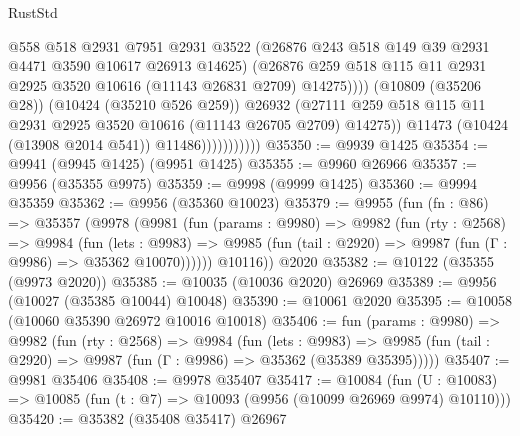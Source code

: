 \begin{lexlean}{RustStd}
\begin{coremodule}
                                  @558
                                  @518
                                  @2931
                                  @7951
                                  @2931
                                  @3522
                                  (@26876 @243 @518 @149 @39 @2931 @4471 @3590 @10617 @26913 @14625)
                                  (@26876
                                    @259
                                    @518
                                    @115
                                    @11
                                    @2931
                                    @2925
                                    @3520
                                    @10616
                                    (@11143 @26831 @2709)
                                    @14275))))
                            (@10809 (@35206 @28))
                            (@10424 (@35210 @526 @259))
                            @26932
                            (@27111
                              @259
                              @518
                              @115
                              @11
                              @2931
                              @2925
                              @3520
                              @10616
                              (@11143 @26705 @2709)
                              @14275))
                          @11473
                          (@10424 (@13908 @2014 @541))
                          @11486)))))))))))
@35350 := @9939 @1425
@35354 := @9941 (@9945 @1425) (@9951 @1425)
@35355 := @9960 @26966
@35357 := @9956 (@35355 @9975)
@35359 := @9998 (@9999 @1425)
@35360 := @9994 @35359
@35362 := @9956 (@35360 @10023)
@35379 := @9955
    (fun (fn : @86) =>
    @35357
      (@9978
        (@9981
          (fun (params : @9980) =>
          @9982
            (fun (rty : @2568) =>
            @9984
              (fun (lets : @9983) =>
              @9985 (fun (tail : @2920) => @9987 (fun (Γ : @9986) => @35362 @10070))))))
        @10116))
    @2020
@35382 := @10122 (@35355 (@9973 @2020))
@35385 := @10035 (@10036 @2020) @26969
@35389 := @9956 (@10027 (@35385 @10044) @10048)
@35390 := @10061 @2020
@35395 := @10058 (@10060 @35390 @26972 @10016 @10018)
@35406 := fun (params : @9980) =>
  @9982
    (fun (rty : @2568) =>
    @9984
      (fun (lets : @9983) =>
      @9985 (fun (tail : @2920) => @9987 (fun (Γ : @9986) => @35362 (@35389 @35395)))))
@35407 := @9981 @35406
@35408 := @9978 @35407
@35417 := @10084
    (fun (U : @10083) => @10085 (fun (t : @7) => @10093 (@9956 (@10099 @26969 @9974) @10110)))
@35420 := @35382 (@35408 @35417) @26967

\end{coremodule}
\end{lexlean}
